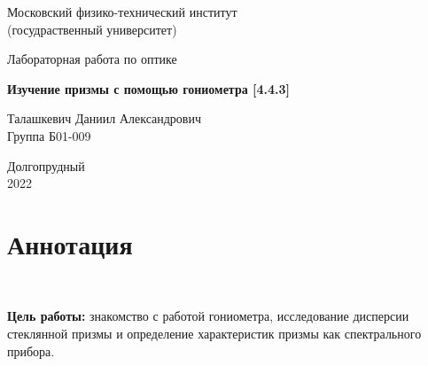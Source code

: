 \documentclass[a4paper, 12pt]{article}%
\begin{document}


\begin{titlepage}

	\newpage
	\begin{center}
		\normalsize Московский физико-технический институт \\(госудраственный 			университет)
	\end{center}

	\vspace{6em}

	\begin{center}
		\Large Лабораторная работа по оптике\\
	\end{center}

	\vspace{1em}

	\begin{center}
		\large \textbf{Изучение призмы с помощью гониометра [4.4.3]}
	\end{center}

	\vspace{2em}

	\begin{center}
		\large Талашкевич Даниил Александрович\\
		Группа Б01-009
	\end{center}

	\vspace{\fill}

	\begin{center}
	Долгопрудный \\2022
	\end{center}
	
\end{titlepage}



	\thispagestyle{empty}
	\newpage
	\tableofcontents
	\newpage
	\setcounter{page}{1}



\section{Аннотация}

$\text{ }$

\textbf{Цель работы:} знакомство с работой гониометра, исследование дисперсии стеклянной призмы и определение характеристик призмы как спектрального прибора.
	
\end{document}
